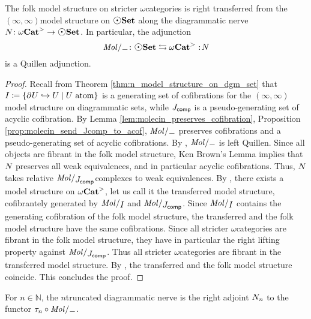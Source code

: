 \begin{thm} \label{thm:quillen_folk_dgm_infty}
    The folk model structure on stricter \( \omega \)\nbd categories is right transferred from the \( (\infty, \infty) \)\nbd model structure on \( \dgmSet \) along the diagrammatic nerve \( \N{} \colon \somegaCat \to \dgmSet \).
    In particular, the adjunction 
    \begin{equation*}
        \molecin{-} \colon \dgmSet \leftrightarrows \somegaCat \cocolon \N{}
    \end{equation*}
    is a Quillen adjunction.
\end{thm}
\begin{proof}
    Recall from Theorem \ref{thm:n_model_structure_on_dgm_set} that \( I \coloneqq \left\{ {\partial_{}^{} U \hookrightarrow U \mid U \text{ atom}} \right\} \) is a generating set of cofibrations for the \( (\infty, \infty) \)\nbd model structure on diagrammatic sets, while \( J_{\mathsf{comp}} \) is a pseudo-generating set of acyclic cofibration. 
    By Lemma \ref{lem:molecin_preserves_cofibration}, Proposition \ref{prop:molecin_send_Jcomp_to_acof}, \( \molecin{-} \) preserves cofibrations and a pseudo-generating set of acyclic cofibrations.
    By \cite[E.2.14]{joyal2008theory}, \( \molecin{-} \) is left Quillen. 
    Since all objects are fibrant in the folk model structure, Ken Brown's Lemma implies that \( N_{} \) preserves all weak equivalences, and in particular acyclic cofibrations. 
    Thus, \( N_{} \) takes relative \( \molecin{\Jcomp} \)\nbd complexes to weak equivalences.
    By \cite[Theorem 11.3.2]{hirschhorn2003model}, there exists a model structure on \( {\omega\mathbf{Cat}}^> \), let us call it the transferred model structure, cofibrantely generated by \( \molecin{I} \) and \( \molecin{\Jcomp} \).
    Since \( \molecin{I} \) contains the generating cofibration of the folk model structure, the transferred and the folk model structure have the same cofibrations.
    Since all stricter \( \omega \)\nbd categories are fibrant in the folk model structure, they have in particular the right lifting property against \( \molecin{\Jcomp} \).
    Thus all stricter \( \omega \)\nbd categories are fibrant in the transferred model structure.
    By \cite[Proposition E.1.10]{joyal2008theory}, the transferred and the folk model structure coincide.
    This concludes the proof.
\end{proof}

\begin{dfn} 
    For \( n \in \mathbb{N} \), the \( n \)\nbd truncated diagrammatic nerve is the right adjoint \( N_{n} \) to the functor \( \trunc{n} \after \molecin{-} \).
\end{dfn}

